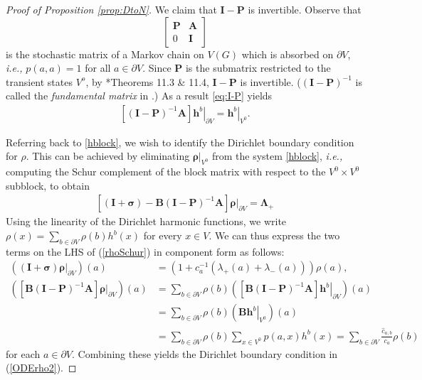 \documentclass[11pt]{amsart}
\theoremstyle{plain}
\theoremstyle{definition}
\theoremstyle{remark}
\begin{document}
\begin{proof}[Proof of Proposition \ref{prop:DtoN}]
We claim that $\boldsymbol I - \boldsymbol P$ is invertible. Observe that
$$
\begin{bmatrix} \boldsymbol P & \boldsymbol A \\ 0 & \boldsymbol I \end{bmatrix}
$$
is the stochastic matrix of a Markov chain on $V(G)$ which is absorbed on $\partial V$, \emph{i.e.,} $p(a,a)=1$ for all $a\in \partial V$. Since $\boldsymbol P$ is the submatrix restricted to the transient states $V^o$, by \cite{GrinsteadSnell}*{Theorems 11.3 \& 11.4}, $\boldsymbol I - \boldsymbol P$ is invertible. ($(\boldsymbol I-\boldsymbol P)^{-1}$ is called the \emph{fundamental matrix} in \cites{GrinsteadSnell, DoyleSnell}.)
As a result \eqref{eq:I-P} yields
\begin{align}
\left[(\boldsymbol I-\boldsymbol P)^{-1} \boldsymbol A\right] \left.\boldsymbol h^b\right|_{\partial V} = \left.\boldsymbol h^b\right|_{V^0}.
\end{align} 

Referring back to \eqref{hblock}, we wish to identify the Dirichlet boundary condition for $\rho$. This can be achieved by eliminating $\left.\boldsymbol \rho\right|_{V^0}$ from the system \eqref{hblock}, \emph{i.e.,} computing the Schur complement of the block matrix with respect to the $V^0\times V^0$ subblock, to obtain
\begin{align}
\label{rhoSchur}
\left[(\boldsymbol I + \boldsymbol \sigma)-\boldsymbol B (\boldsymbol I -\boldsymbol P)^{\boldsymbol -1}\boldsymbol A \right] \left. \boldsymbol \rho\right|_{\partial V} = {\boldsymbol\Lambda}_+ 
\end{align}
Using the linearity of the Dirichlet harmonic functions, we write $\rho(x) = \sum_{b\in \partial V} \rho(b) h^b(x)$ for every $x\in V$. We can thus express the two terms on the LHS of (\ref{rhoSchur}) in component form as follows:
\begin{align*}
\left((\boldsymbol I + \boldsymbol \sigma) \left.\boldsymbol \rho\right|_{\partial V}\right)(a) &= \left(1+c_a^{-1} (\lambda_+(a) + \lambda_-(a))\right) \rho(a),\\
\left(\left[\boldsymbol B(\boldsymbol I-\boldsymbol P)^{-1} \boldsymbol A\right] \left.\boldsymbol \rho\right|_{\partial V}\right)(a) &= \sum_{b\in \partial V} \rho(b) \left(\left[\boldsymbol B(\boldsymbol I-\boldsymbol P)^{-1} \boldsymbol A\right] \left.\boldsymbol h^b\right|_{\partial V} \right)(a)\\
\nonumber &=\sum_{b\in \partial V} \rho(b) \left(\boldsymbol B \left.\boldsymbol h^b\right|_{V^0}\right) (a) \\
\nonumber &=\sum_{b\in \partial V} \rho(b) \sum_{x\in V^0} p(a,x) h^b(x) = \sum_{b\in \partial V} \frac{\hat{c}_{a,b}}{c_a} \rho(b)
\end{align*}
for each $a\in \partial V$. Combining these yields the Dirichlet boundary condition in (\ref{ODErho2}).
\end{proof}
\end{document}
